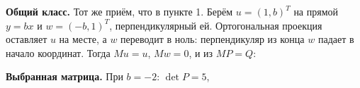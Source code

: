 \documentclass[a4paper,14pt]{extarticle}
\begin{document}
\textbf{Общий класс.} Тот же приём, что в пункте 1. Берём
\(u = (1, b)^T\) на прямой \(y = bx\) и \(w = (-b, 1)^T\),
перпендикулярный ей. Ортогональная проекция оставляет \(u\) на месте, а
\(w\) переводит в ноль: перпендикуляр из конца \(w\) падает в начало
координат. Тогда \(Mu = u\), \(Mw = 0\), и из \(MP = Q\):

\begin{center}\end{center}

\begin{center}\end{center}

\textbf{Выбранная матрица.} При \(b = -2\): \(\det P = 5\),

\begin{center}\end{center}

\begin{center}\end{center}
\end{document}
